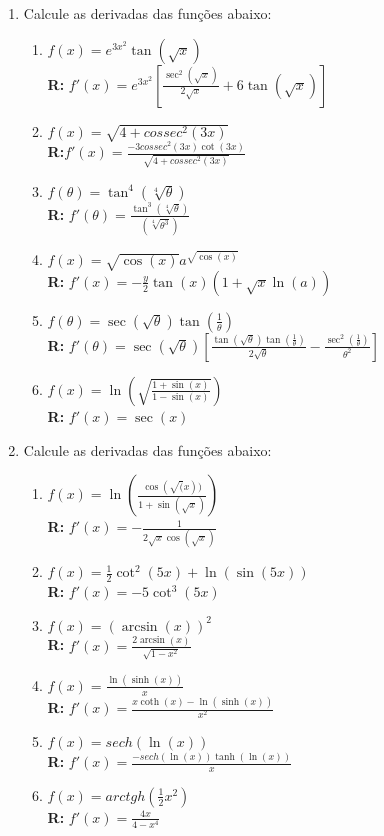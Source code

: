 \documentclass[oneside,a4paper,12pt]{article}
\begin{document}
\begin{enumerate}
	\item Calcule as derivadas das funções abaixo:
		\begin{enumerate}
			\item $f(x) = e^{3x^2}\tan(\sqrt{x})$ \\ {\bf R:} $f'(x) = e^{3x^2}\left[ \frac{\sec^2(\sqrt{x})}{2\sqrt{x}}+6\tan(\sqrt{x}) \right]$
			\item $f(x) = \sqrt{4 + cossec^2(3x)}$ \\ {\bf R:}$f'(x) = \frac{-3cossec^2(3x)\cot(3x)}{\sqrt{4 + cossec^2(3x)}}$
			\item $f(\theta) = \tan^4(\sqrt[4]{\theta})$ \\ {\bf R:} $f'(\theta) = \frac{\tan^3(\sqrt[4]{\theta})}{(\sqrt[4]{\theta^3})}$
			\item $f(x) = \sqrt{\cos(x)}a^{\sqrt{\cos(x)}}$ \\ {\bf R:} $f'(x) = -\frac{y}{2}\tan(x)(1+\sqrt{x}\ln(a))$
			\item $f(\theta) = \sec(\sqrt{\theta})\tan(\frac{1}{\theta})$ \\ {\bf R:} $f'(\theta) = \sec(\sqrt{\theta})\left[ \frac{\tan(\sqrt{\theta})\tan(\frac{1}{\theta})}{2\sqrt{\theta}}-\frac{\sec^{2}(\frac{1}{\theta})}{\theta^{2}} \right]$
			\item $f(x) = \ln\left(\sqrt{\frac{1 + \sin(x)}{1- \sin(x)}}\right)$ \\ {\bf R:} $f'(x) = \sec(x)$
		\end{enumerate}
	
	\item Calcule as derivadas das funções abaixo:
		\begin{enumerate}
			\item $f(x) = \ln(\frac{\cos(\sqrt(x))}{1+\sin(\sqrt{x})})$ \\ {\bf R:} $f'(x) = -\frac{1}{2\sqrt{x}\cos(\sqrt{x})}$
			\item $f(x) = \frac{1}{2}\cot^2(5x)+\ln(\sin(5x))$ \\ {\bf R:} $f'(x) = -5\cot^3(5x)$
			\item $f(x) = (\arcsin(x))^2$ \\ {\bf R:} $f'(x) = \frac{2\arcsin(x)}{\sqrt{1-x^2}}$
			\item $f(x) = \frac{\ln(\sinh(x))}{x}$ \\ {\bf R:} $f'(x) = \frac{x \coth(x) - \ln(\sinh(x))}{x^2}$
			\item $f(x) = sech(\ln(x))$ \\ {\bf R:} $f'(x) = \frac{-sech(\ln(x))\tanh(\ln(x))}{x}$
			\item $f(x) = arctgh(\frac{1}{2}x^2)$ \\ {\bf R:} $f'(x) = \frac{4x}{4-x^4}$
		\end{enumerate}
	

\end{enumerate}
\end{document}
